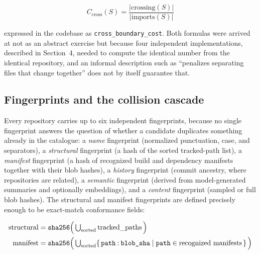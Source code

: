 \documentclass[11pt]{article}
\begin{document}
\begin{equation}
C_{\mathrm{cross}}(S) = \frac{|\mathrm{crossing}(S)|}{|\mathrm{imports}(S)|}
\end{equation}

expressed in the codebase as \texttt{cross\_boundary\_cost}. Both formulas were arrived at not as an abstract exercise but because four independent implementations, described in Section~4, needed to compute the identical number from the identical repository, and an informal description such as ``penalizes separating files that change together'' does not by itself guarantee that.

\subsection{Fingerprints and the collision cascade}

Every repository carries up to six independent fingerprints, because no single fingerprint answers the question of whether a candidate duplicates something already in the catalogue: a \emph{name} fingerprint (normalized punctuation, case, and separators), a \emph{structural} fingerprint (a hash of the sorted tracked-path list), a \emph{manifest} fingerprint (a hash of recognized build and dependency manifests together with their blob hashes), a \emph{history} fingerprint (commit ancestry, where repositories are related), a \emph{semantic} fingerprint (derived from model-generated summaries and optionally embeddings), and a \emph{content} fingerprint (sampled or full blob hashes). The structural and manifest fingerprints are defined precisely enough to be exact-match conformance fields:

\begin{align}
\mathrm{structural} &= \texttt{sha256}\Bigl(\, \textstyle\bigcup_{\text{sorted}} \text{tracked\_paths} \,\Bigr) \\
\mathrm{manifest} &= \texttt{sha256}\Bigl(\, \textstyle\bigcup_{\text{sorted}} \{\, \texttt{path} \mathbin{:} \texttt{blob\_sha} \mid \texttt{path} \in \text{recognized manifests} \,\} \,\Bigr)
\end{align}
\end{document}
